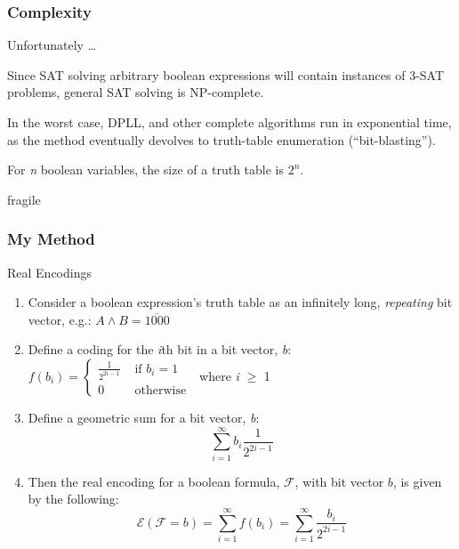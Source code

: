 \documentclass{beamer}
\begin{document}
\begin{frame}
\frametitle{Complexity}
\begin{block}
{Unfortunately \ldots} 

Since SAT solving arbitrary boolean expressions will contain instances of 3-SAT problems, general SAT solving is NP-complete.

In the worst case, DPLL, and other complete algorithms run in exponential time, as the method eventually devolves to truth-table enumeration (``bit-blasting'').

For \emph n boolean variables, the size of a truth table is \(2^n\).

\end{block}
\end{frame}

\begin{frame}{fragile}
\frametitle{My Method}
\begin{block}
{Real Encodings}

\begin{enumerate}
\item {\tiny Consider a boolean expression's truth table as an infinitely long, \emph{repeating} bit vector, e.g.: \(A \land B = \overline{1000}\) }
\item {\tiny Define a coding for the \emph{i}th bit in a bit vector, \emph{b}: \( f(b_i) = \begin{cases} \frac{1}{2^{2i-1}} & \text{ if } b_i = 1\\ 0  & \text{ otherwise } \end{cases}\) where \emph{i} \(\geq\) 1 }
\item {\tiny Define a geometric sum for a bit vector, \emph b: }
  \[
  \sum_{i=1}^\infty b_i \frac{1}{2^{2i-1}}
  \]
\item {\tiny Then the real encoding for a boolean formula, \(\mathcal{F}\), with bit vector \(b\), is given by the following:}
  \[
  \mathcal{E}(\mathcal{F} = b) = \sum_{i=1}^\infty
 f(b_i) = \sum_{i=1}^\infty \frac{b_i}{2^{2i-1}}
  \]
\end{enumerate}


\end{block}
\end{frame}

\begin{comment}
\begin{cases} 
\frac{1}{2^{2i-1}} & \text{ if } b_i = 1\\ 0  & \text{ otherwise }
 \end{cases}
\end{comment}
\end{document}
